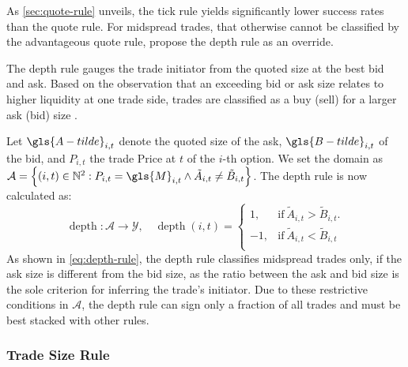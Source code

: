 As \cref{sec:quote-rule} unveils, the tick rule yields significantly lower success rates than the quote rule. For midspread trades, that otherwise cannot be classified by the advantageous quote rule, \textcite[][14]{grauerOptionTradeClassification2022} propose the depth rule as an override.

The depth rule gauges the trade initiator from the quoted size at the best bid and ask. Based on the observation that an exceeding bid or ask size relates to higher liquidity at one trade side, trades are classified as a buy (sell) for a larger ask (bid) size \autocite[][14]{grauerOptionTradeClassification2022}.

Let $\gls{A-tilde}_{i,t}$ denote the quoted size of the ask, $\gls{B-tilde}_{i,t}$ of the bid, and $P_{i,t}$ the trade Price at $t$ of the $i$-th option. We set the domain as $\mathcal{A} = \left\{(i, t) \in \mathbb{N}^2: P_{i,t} = \gls{M}_{i,t} \land \tilde{A}_{i,t} \neq \tilde{B}_{i,t} \right\}$. The depth rule is now calculated as:
\begin{equation}
    \operatorname{depth} \colon \mathcal{A} \to \mathcal{Y},\quad
    \operatorname{depth}(i, t)=
    \begin{cases}
        1,  & \mathrm{if}\ \tilde{A}_{i,t} > \tilde{B}_{i,t}. \\
        -1, & \mathrm{if}\ \tilde{A}_{i,t} < \tilde{B}_{i,t}\\
    \end{cases}
    \label{eq:depth-rule}
\end{equation}
As shown in \cref{eq:depth-rule}, the depth rule classifies midspread trades only, if the ask size is different from the bid size, as the ratio between the ask and bid size is the sole criterion for inferring the trade's initiator. Due to these restrictive conditions in $\mathcal{A}$, the depth rule can sign only a fraction of all trades and must be best stacked with other rules.

\subsubsection{Trade Size Rule}\label{sec:trade-size-rule}

